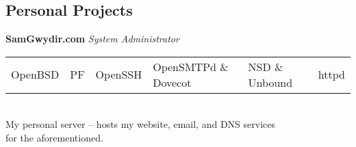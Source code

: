 \documentclass[margin,line,12pt]{res}
\begin{document}
{\begin{resume}


\vspace*{.20in}
{\color{Black}
  \vspace{-.13in}
  \section{\sc Personal Projects}}
\color{black}
{\bf SamGwydir.com} {\em System Administrator } \
\\
\begin{tabular}{l l l l l l}
  OpenBSD & PF & OpenSSH & OpenSMTPd \& Dovecot & NSD \& Unbound & httpd
\end{tabular}
\\
My personal server -- hosts my website, email, and DNS services \\
for the aforementioned.
%



\end{resume}}
\end{document}
